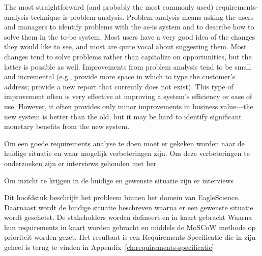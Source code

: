 The most straightforward (and probably the most commonly used) requirements-analysis technique is problem analysis. Problem analysis means asking the users and managers to identify problems with the as-is system and to describe how to solve them in the to-be system. Most users have a very good idea of the changes they would like to see, and most are quite vocal about suggesting them. Most changes tend to solve problems rather than capitalize on opportunities, but the latter is possible as well. Improvements from problem analysis tend to be small and incremental (e.g., provide more space in which to type the customer’s address; provide a new report that currently does not exist).
This type of improvement often is very effective at improving a system’s efficiency or ease of use. However, it often provides only minor improvements in business value—the new system is better than the old, but it may be hard to identify significant monetary benefits from the new system.







Om een goede requirements analyse te doen moet er gekeken worden naar de huidige situatie en waar mogelijk verbeteringen zijn. Om deze verbeteringen te onderzoeken zijn er interviews gehouden met ber






Om inzicht te krijgen in de huidige en gewenste situatie zijn er interviews


Dit hoofdstuk beschrijft het probleem binnen het domein van EagleScience. Daarnaast wordt de huidige situatie beschreven waarna er een gewenste situatie wordt geschetst. De stakeholders worden defineert en in kaart gebracht Waarna hun requirements in kaart worden gebracht en middels de MoSCoW methode op prioriteit worden gezet. Het resultaat is een Requirements Specificatie die in zijn geheel is terug te vinden in Appendix~\ref{ch:requirements-specificatie}



